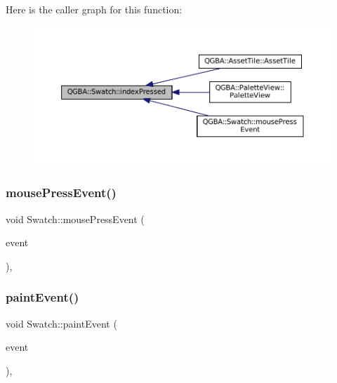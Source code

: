 Here is the caller graph for this function\+:
\nopagebreak
\begin{figure}[H]
\begin{center}
\leavevmode
\includegraphics[width=350pt]{class_q_g_b_a_1_1_swatch_a35af6511c4d2750347c7bcc406cc1137_icgraph}
\end{center}
\end{figure}
\mbox{\label{class_q_g_b_a_1_1_swatch_a0014bb2dc20fc5dceaa64566db83335f}} 
\subsubsection{\texorpdfstring{mouse\+Press\+Event()}{mousePressEvent()}}
{\footnotesize\ttfamily void Swatch\+::mouse\+Press\+Event (\begin{DoxyParamCaption}\item[{Q\+Mouse\+Event $\ast$}]{event }\end{DoxyParamCaption})\hspace{0.3cm}{\ttfamily [override]}, {\ttfamily [protected]}}

\mbox{\label{class_q_g_b_a_1_1_swatch_a2f975173d122980c736355fde29007b3}} 
\subsubsection{\texorpdfstring{paint\+Event()}{paintEvent()}}
{\footnotesize\ttfamily void Swatch\+::paint\+Event (\begin{DoxyParamCaption}\item[{Q\+Paint\+Event $\ast$}]{event }\end{DoxyParamCaption})\hspace{0.3cm}{\ttfamily [override]}, {\ttfamily [protected]}}

